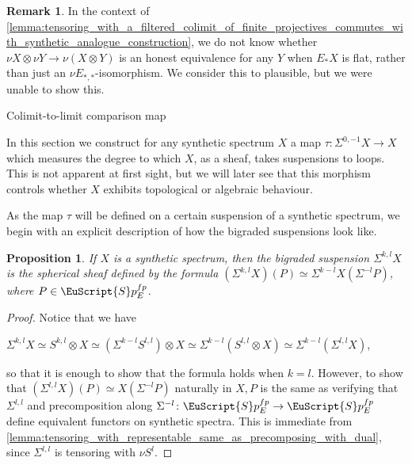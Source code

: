 \documentclass[oneside,a4paper]{amsart}
\makeatletter
\newcommand{\euscr}[1]{\EuScript{#1}} %
\newcommand{\spectra}{\euscr{S}p} %
\newcommand{\spectrafp}{\spectra_{E}^{fp}} %
\theoremstyle{plain}
\newtheorem{prop}[thm]{Proposition}
\theoremstyle{definition}
\newtheorem{rem}[thm]{Remark}
\theoremstyle{remark}
\def\subsection{\@startsection{subsection}{1}%
  \z@{.7\linespacing\@plus\linespacing}{.5\linespacing}%
  {\normalfont\bfseries\centering}}%
\makeatother
\begin{document}
\begin{rem}
In the context of \cref{lemma:tensoring_with_a_filtered_colimit_of_finite_projectives_commutes_with_synthetic_analogue_construction}, we do not know whether $\nu X \otimes \nu Y \rightarrow \nu (X \otimes Y)$ is an honest equivalence for any $Y$ when $E_{*}X$ is flat, rather than just an $\nu E_{*,*}$-isomorphism. We consider this to plausible, but we were unable to show this. 
\end{rem}

\subsection{Colimit-to-limit comparison map} 

In this section we construct for any synthetic spectrum $X$ a map $\tau \colon \Sigma^{0, -1} X \rightarrow X$ which measures the degree to which $X$, as a sheaf, takes suspensions to loops. This is not apparent at first sight, but we will later see that this morphism controls whether $X$ exhibits topological or algebraic behaviour. 

As the map $\tau$ will be defined on a certain suspension of a synthetic spectrum, we begin with an explicit description of how the bigraded suspensions look like. 

\begin{prop}
\label{prop:explicit_description_of_bigraded_suspensions}
If $X$ is a synthetic spectrum, then the bigraded suspension $\Sigma^{k, l} X$ is the spherical sheaf defined by the formula $(\Sigma^{k, l} X)(P) \simeq \Sigma^{k-l} X(\Sigma^{-l} P)$, where $P \in \spectrafp$.
\end{prop}

\begin{proof}
Notice that we have

\begin{center}
$\Sigma^{k, l} X \simeq S^{k, l} \otimes X \simeq (\Sigma^{k-l} S^{l, l}) \otimes X \simeq \Sigma^{k-l} (S^{l, l} \otimes X) \simeq \Sigma^{k-l} (\Sigma^{l, l} X)$,
\end{center}
so that it is enough to show that the formula holds when $k = l$. However, to show that $(\Sigma^{l, l} X)(P) \simeq X(\Sigma^{-l} P)$ naturally in $X, P$ is the same as verifying that $\Sigma^{l, l}$ and precomposition along $\Sigma^{-l} \colon \spectra_{E}^{fp} \rightarrow \spectra_{E}^{fp}$ define equivalent functors on synthetic spectra. This is immediate from \cref{lemma:tensoring_with_representable_same_as_precomposing_with_dual}, since $\Sigma^{l, l}$ is tensoring with $\nu S^{l}$. 
\end{proof}
\end{document}
